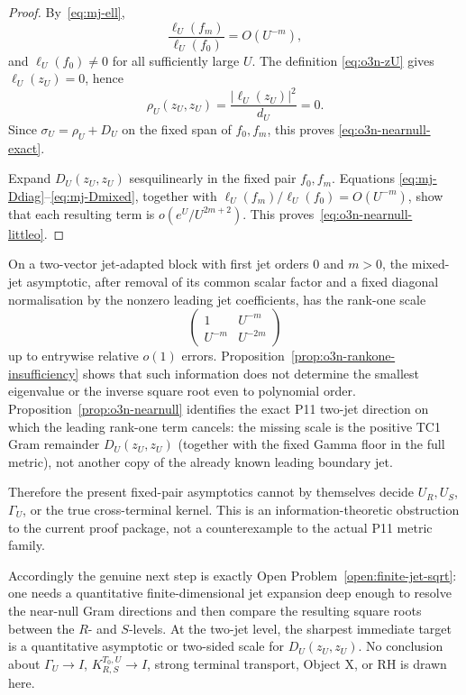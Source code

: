 \begin{proof}
By~\eqref{eq:mj-ell},
\[
 \frac{\ell_U(f_m)}{\ell_U(f_0)}=O(U^{-m}),
\]
and $\ell_U(f_0)\ne0$ for all sufficiently large $U$.  The definition
\eqref{eq:o3n-zU} gives $\ell_U(z_U)=0$, hence
\[
 \rho_U(z_U,z_U)=\frac{|\ell_U(z_U)|^2}{d_U}=0.
\]
Since $\sigma_U=\rho_U+D_U$ on the fixed span of $f_0,f_m$, this proves
\eqref{eq:o3n-nearnull-exact}.

Expand $D_U(z_U,z_U)$ sesquilinearly in the fixed pair $f_0,f_m$.  Equations
\eqref{eq:mj-Ddiag}--\eqref{eq:mj-Dmixed}, together with
$\ell_U(f_m)/\ell_U(f_0)=O(U^{-m})$, show that each resulting term is
$o(e^U/U^{2m+2})$.  This proves~\eqref{eq:o3n-nearnull-littleo}.
\end{proof}

\begin{remark}\label{rem:o3n-firewall}
On a two-vector jet-adapted block with first jet orders $0$ and $m>0$, the mixed-jet
asymptotic, after removal of its common scalar factor and a fixed diagonal
normalisation by the nonzero leading jet coefficients, has the rank-one scale
\[
 \begin{pmatrix}
 1&U^{-m}\\
 U^{-m}&U^{-2m}
 \end{pmatrix}
\]
up to entrywise relative $o(1)$ errors.  Proposition~\ref{prop:o3n-rankone-insufficiency}
shows that such information does not determine the smallest eigenvalue or the inverse
square root even to polynomial order.  Proposition~\ref{prop:o3n-nearnull} identifies
the exact P11 two-jet direction on which the leading rank-one term cancels: the missing
scale is the positive TC1 Gram remainder $D_U(z_U,z_U)$ (together with the fixed Gamma
floor in the full metric), not another copy of the already known leading boundary jet.

Therefore the present fixed-pair asymptotics cannot by themselves decide $U_R,U_S$,
$\Gamma_U$, or the true cross-terminal kernel.  This is an information-theoretic
obstruction to the current proof package, not a counterexample to the actual P11 metric
family.

Accordingly the genuine next step is exactly Open Problem~\ref{open:finite-jet-sqrt}:
one needs a quantitative finite-dimensional jet expansion deep enough to resolve the
near-null Gram directions and then compare the resulting square roots between the
$R$- and $S$-levels.  At the two-jet level, the sharpest immediate target is a
quantitative asymptotic or two-sided scale for $D_U(z_U,z_U)$.  No conclusion about
$\Gamma_U\to I$, $K_{R,S}^{T_0,U}\to I$, strong terminal transport, Object X, or RH is
drawn here.
\end{remark}
